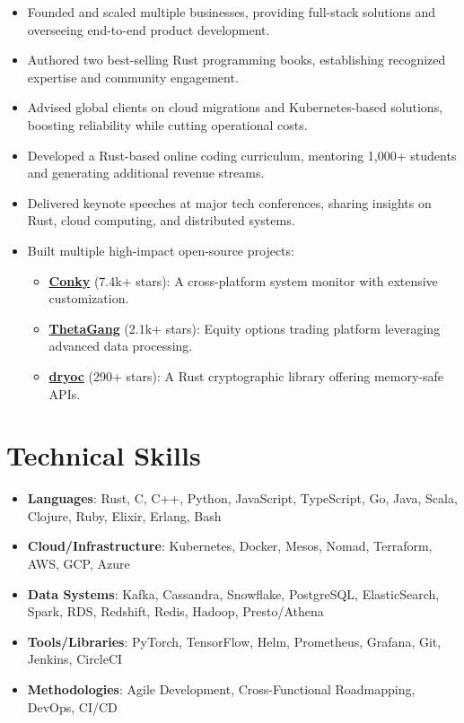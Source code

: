 \documentclass[margin,line]{resume}
\begin{document}
\begin{resume}
\begin{itemize}
    \item Founded and scaled multiple businesses, providing full-stack solutions and overseeing end-to-end product development.
    \item Authored two best-selling Rust programming books, establishing recognized expertise and community engagement.
    \item Advised global clients on cloud migrations and Kubernetes-based solutions, boosting reliability while cutting operational costs.
    \item Developed a Rust-based online coding curriculum, mentoring 1,000+ students and generating additional revenue streams.
    \item Delivered keynote speeches at major tech conferences, sharing insights on Rust, cloud computing, and distributed systems.
    \item Built multiple high-impact open-source projects:
        \begin{itemize}
            \item \href{https://github.com/brndnmtthws/conky/}{\textbf{Conky}} (7.4k+ stars): A cross-platform system monitor with extensive customization.
            \item \href{https://github.com/brndnmtthws/thetagang/}{\textbf{ThetaGang}} (2.1k+ stars): Equity options trading platform leveraging advanced data processing.
            \item \href{https://github.com/brndnmtthws/dryoc/}{\textbf{dryoc}} (290+ stars): A Rust cryptographic library offering memory-safe APIs.
        \end{itemize}
\end{itemize}

\vspace{10pt}

\section{Technical Skills}

\begin{itemize}[partopsep=0mm]
    \item \textbf{Languages}: Rust, C, C++, Python, JavaScript, TypeScript, Go, Java, Scala, Clojure, Ruby, Elixir, Erlang, Bash
    \item \textbf{Cloud/Infrastructure}: Kubernetes, Docker, Mesos, Nomad, Terraform, AWS, GCP, Azure
    \item \textbf{Data Systems}: Kafka, Cassandra, Snowflake, PostgreSQL, ElasticSearch, Spark, RDS, Redshift, Redis, Hadoop, Presto/Athena
    \item \textbf{Tools/Libraries}: PyTorch, TensorFlow, Helm, Prometheus, Grafana, Git, Jenkins, CircleCI
    \item \textbf{Methodologies}: Agile Development, Cross-Functional Roadmapping, DevOps, CI/CD
\end{itemize}


\end{resume}
\end{document}

